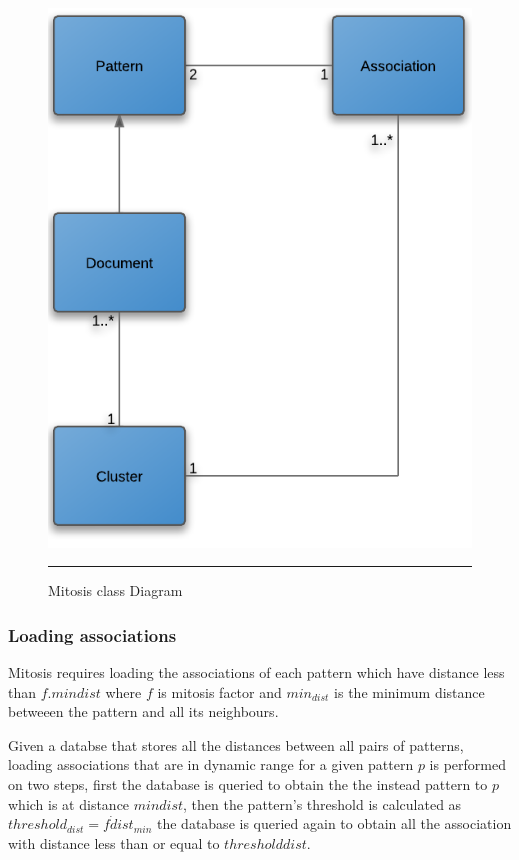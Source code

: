 \begin{figure}[htbp]
	\centering
		\includegraphics{./Figures/Mitosis_6.png}
		\rule{25em}{0.3pt}
	\caption[Mitosis class Diagram]{Mitosis class Diagram}
	\label{fig:mitosis_6}
\end{figure}

\subsubsection{Loading associations} 
Mitosis requires loading the associations of each pattern which have distance less than $f.min{dist}$ where $f$ is mitosis factor and $min_{dist}$ is the minimum distance betweeen the pattern and all its neighbours.

Given a databse that stores all the distances between all pairs of patterns, loading associations that are in dynamic range for a given pattern $p$ is performed on two steps, first the database is queried to obtain the the instead pattern to $p$ which is at distance $min{dist}$, then the pattern's threshold is calculated as $threshold_{dist} = f \dot dist_{min}$ the database is queried again to obtain all the association with distance less than or equal to $threshold{dist}$.


